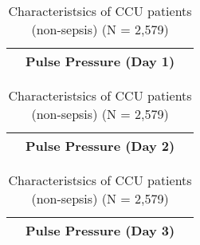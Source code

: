 \begin{table}[h]

\scriptsize{ 
\begin{tabular}{l c c c c c}
\toprule
& \multicolumn{4}{c}{\textbf{Pulse Pressure (Day 1)}}\\



\bottomrule
\end{tabular}
\caption{Characteristsics of CCU patients (non-sepsis) (N = 2,579)}
}
\end{table}



\begin{table}[h]

\scriptsize{ 
\begin{tabular}{l c c c c c}
\toprule
& \multicolumn{4}{c}{\textbf{Pulse Pressure (Day 2)}}\\



\bottomrule
\end{tabular}
\caption{Characteristsics of CCU patients (non-sepsis) (N = 2,579)}
}
\end{table}


\begin{table}[h]

\scriptsize{ 
\begin{tabular}{l c c c c c}
\toprule
& \multicolumn{4}{c}{\textbf{Pulse Pressure (Day 3)}}\\



\bottomrule
\end{tabular}
\caption{Characteristsics of CCU patients (non-sepsis) (N = 2,579)}
}
\end{table}



